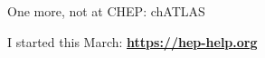 \documentclass[aspectratio=169]{beamer}
\begin{document}
\begin{frame}{One more, not at CHEP: chATLAS}
\vspace{0.2 cm}
\begin{center}
\end{center}
\end{frame}

\begin{frame}{I started this March: {\bf \url{https://hep-help.org}}}
\vspace{0.25 cm}
\begin{center}
\end{center}
\end{frame}
\end{document}

